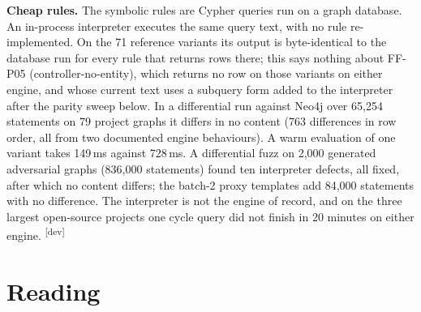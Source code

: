 \documentclass[10pt,a4paper]{article}
\newcommand{\devset}{\textsuperscript{\textsf{\tiny[dev]}}}
\begin{document}
\textbf{Cheap rules.} The symbolic rules are Cypher queries run on a graph database. An in-process interpreter
executes the same query text, with no rule re-implemented. On the 71 reference variants its output is byte-identical
to the database run for every rule that returns rows there; this says nothing about FF-P05 (controller-no-entity),
which returns no row on those variants on either engine, and whose current text uses a subquery form added to the
interpreter after the parity sweep below. In a differential run against Neo4j over 65,254 statements on 79 project graphs it differs in
no content (763 differences in row order, all from two documented engine behaviours). A warm evaluation of one
variant takes 149\,ms against 728\,ms. A differential fuzz on 2,000 generated adversarial graphs (836,000 statements)
found ten interpreter defects, all fixed, after which no content differs; the batch-2 proxy templates add 84,000
statements with no difference. The interpreter is not the engine of record, and on the three largest open-source
projects one cycle query did not finish in 20 minutes on either engine. \devset{}

\section{Reading}
\end{document}
